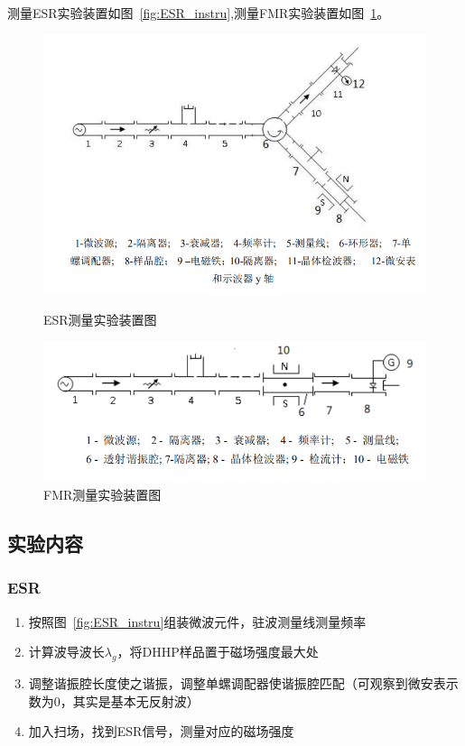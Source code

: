 \documentclass[10pt]{ctexart}
\begin{document}
测量ESR实验装置如图~\ref{fig:ESR_instru},测量FMR实验装置如图~\ref{fig:FMR_instru}。
\begin{figure}[htbp]
    \centering
    \begin{minipage}{0.45\textwidth}
        \centering
        \includegraphics[width=\textwidth]{figure/ESR_instru.png}
        \caption{ESR测量实验装置图}
        \label{fig:ESR_instru}
    \end{minipage}
    \qquad
    \begin{minipage}{0.45\textwidth}
        \centering
        \includegraphics[width=\textwidth]{figure/FMR_instru.png}
        \caption{FMR测量实验装置图}
        \label{fig:FMR_instru}
    \end{minipage}
\end{figure}

\subsection{实验内容}
\subsubsection{ESR}
\begin{enumerate}
    \item 按照图~\ref{fig:ESR_instru}组装微波元件，驻波测量线测量频率
    \item 计算波导波长$\lambda_g$，将DHHP样品置于磁场强度最大处
    \item 调整谐振腔长度使之谐振，调整单螺调配器使谐振腔匹配（可观察到微安表示数为0，其实是基本无反射波）
    \item 加入扫场，找到ESR信号，测量对应的磁场强度
\end{enumerate}
\end{document}

